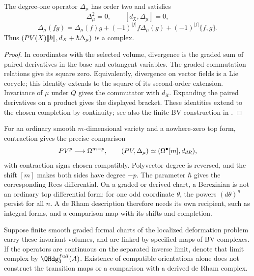 \begin{theorem}
The degree-one operator $\Delta_\mu$ has order two and satisfies
\[
 \Delta_\mu^2=0,\qquad [d_{\mathfrak X},\Delta_\mu]=0,
\]
\[
 \Delta_\mu(fg)=\Delta_\mu(f)g+(-1)^{|f|}f\Delta_\mu(g)
                 +(-1)^{|f|}\{f,g\}.
\]
Thus $(PV(X)\llbracket\hbar\rrbracket,
d_{X}+\hbar\Delta_\mu)$ is a complex.
\end{theorem}
\begin{proof}
In coordinates with the selected volume, divergence is the graded sum of
paired derivatives in the base and cotangent variables. The graded
commutation relations give its square zero. Equivalently, divergence on
vector fields is a Lie cocycle; this identity extends to the square of its
second-order extension. Invariance of $\mu$ under $Q$ gives the commutator
with $d_{\mathfrak X}$. Expanding the paired derivatives on a product gives
the displayed bracket. These identities extend to the chosen completion
by continuity; see also the finite BV construction in \cite{SchwarzBV}.
\end{proof}

For an ordinary smooth $m$-dimensional variety and a nowhere-zero top form,
contraction gives the precise comparison
\[
 PV^p\longrightarrow\Omega^{m-p},\qquad
 (PV,\Delta_\mu)\simeq(\Omega^\bullet[m],d_{dR}),
\]
with contraction signs chosen compatibly. Polyvector degree is reversed,
and the shift $[m]$ makes both sides have degree $-p$. The parameter $\hbar$
gives the corresponding Rees differential. On a graded or derived chart,
a Berezinian is not an ordinary top differential form: for one odd coordinate
$\theta$, the powers $(d\theta)^n$ persist for all $n$. A de Rham description
therefore needs its own recipient, such as integral forms, and a comparison
map with its shifts and completion.

\begin{definition}
Suppose finite smooth graded formal charts of the localized deformation
problem carry these invariant volumes, and are linked by specified maps of
BV complexes. If the operators are continuous on the separated inverse
limit, denote that limit complex by $\QHdg_3^{\mathrm{full}}(\mathbb A)$.
Existence of compatible orientations alone does not construct the transition
maps or a comparison with a derived de Rham complex.
\end{definition}

